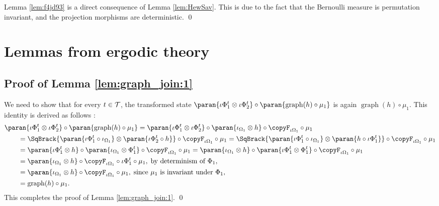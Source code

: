 \documentclass[12pt,oneside,pb-diagram]{article}
\DeclareMathOperator{\graph}{graph}
\begin{document}
Lemma \ref{lem:f4jd93} is a direct consequence of Lemma \ref{lem:HewSav}. This is due to the fact that the Bernoulli measure is permutation invariant, and the projection morphisms are deterministic. \qed

\section{Lemmas from ergodic theory} \label{sec:app:erg}
\subsection{Proof of Lemma \ref{lem:graph_join:1}} \label{sec:proof:graph_join:1}

We need to show that for every $t\in \mathcal{T}$, the transformed state $\paran{ \iota \Phi_1^t \otimes \iota \Phi_2^t } \circ \paran{  \graph(h) \circ \mu_1 }$ is again $\graph(h) \circ \mu_1$. This identity is derived as follows :
%
\[\begin{split}
	& \paran{ \iota \Phi_1^t \otimes \iota \Phi_2^t } \circ \paran{  \graph(h) \circ \mu_1 } = \paran{ \iota \Phi_1^t \otimes \iota \Phi_2^t } \circ \paran{ \iota_{\Omega_1} \otimes h } \circ \copyF_{\iota \Omega_1} \circ \mu_1 \\
	& \quad \quad = \SqBrack{ \paran{\iota \Phi_1^t \circ \iota_{\Omega_1}} \otimes \paran{\iota \Phi_2^t \circ h} } \circ \copyF_{\iota \Omega_1} \circ \mu_1 
	= \SqBrack{ \paran{\iota \Phi_1^t \circ \iota_{\Omega_1}} \otimes \paran{h\circ \iota \Phi_1^t} } \circ \copyF_{\iota \Omega_1} \circ \mu_1  \\
	& \quad \quad = \paran{ \iota \Phi_1^t \otimes h } \circ \paran{\iota_{\Omega_1} \otimes \Phi_1^t} \circ \copyF_{\iota \Omega_1} \circ \mu_1 = \paran{\iota_{\Omega_1} \otimes h } \circ \paran{ \iota \Phi_1^t \otimes \Phi_1^t} \circ \copyF_{\iota \Omega_1} \circ \mu_1 \\
	& \quad \quad = \paran{\iota_{\Omega_1} \otimes h } \circ \copyF_{\iota \Omega_1} \circ \iota \Phi_1^t \circ \mu_1 ,\; \mbox{by determinism of } \Phi_1 , \\
	& \quad \quad = \paran{\iota_{\Omega_1} \otimes h } \circ \copyF_{\iota \Omega_1} \circ \mu_1 ,\; \mbox{since } \mu_1 \mbox{ is invariant under } \Phi_1 , \\
	& \quad \quad = \graph(h) \circ \mu_1 .
\end{split}\]
%
This completes the proof of Lemma \ref{lem:graph_join:1}. \qed
\end{document}
